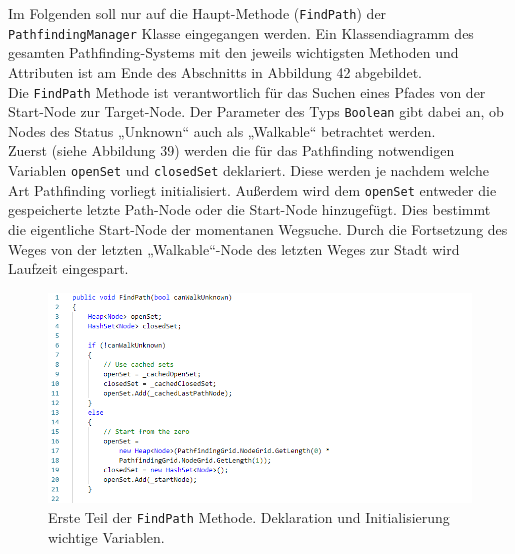 \documentclass[a4paper,12pt]{article}
\newcommand{\code}{\texttt}
\begin{document}
Im Folgenden soll nur auf die Haupt-Methode (\code{FindPath}) der \code{PathfindingManager} Klasse eingegangen werden. Ein Klassendiagramm des gesamten Pathfinding-Systems mit den jeweils wichtigsten Methoden und Attributen ist am Ende des Abschnitts in Abbildung 42 abgebildet.
\\[0.4cm]
Die \code{FindPath} Methode ist verantwortlich für das Suchen eines Pfades von der Start-Node zur Target-Node. Der Parameter des Typs \code{Boolean} gibt dabei an, ob Nodes des Status „Unknown“ auch als „Walkable“ betrachtet werden.
\\[0.4cm]
Zuerst (siehe Abbildung 39) werden die für das Pathfinding notwendigen Variablen \code{openSet} und \code{closedSet} deklariert. Diese werden je nachdem welche Art Pathfinding vorliegt initialisiert. Außerdem wird dem \code{openSet} entweder die gespeicherte letzte Path-Node oder die Start-Node hinzugefügt. Dies bestimmt die eigentliche Start-Node der momentanen Wegsuche. Durch die Fortsetzung des Weges von der letzten „Walkable“-Node des letzten Weges zur Stadt wird Laufzeit eingespart.
\begin{figure}[H]
    \centering
    \includegraphics[width=1\linewidth]{Bilder/Aufgabe3/Teilaufgabe_C/Pathfinding_01.png}
    \caption{Erste Teil der \code{FindPath} Methode. Deklaration und Initialisierung wichtige Variablen.}
\end{figure}
\end{document}
